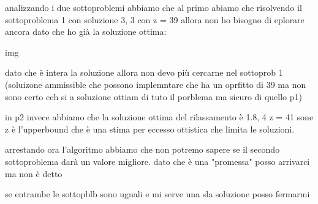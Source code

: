 analizzando i due sottoproblemi abbiamo che al primo abiamo che risolvendo il sottoproblema 1 con soluzione 3, 3 con z = 39 allora non ho bisogno di eplorare ancora dato che ho già la soluzione ottima:

img

dato che è intera la soluzione allora non devo più cercarne nel sottoprob 1 (soluizone ammissible che possono implemntare che ha un oprfitto di 39 ma non sono certo ceh si a soluzione ottiam di tuto il porblema ma sicuro di quello p1)


in p2 invece abbiamo che la soluzione ottima del rilassamento è 1.8, 4 z = 41 sone z è l'upperbound che è una stima per eccesso ottistica che limita le soluzioni.

arrestando ora l'algoritmo abbiamo che non potremo sapere se il secondo sottoproblema darà un valore migliore. dato che è una "promessa" posso arrivarci ma non è detto

se entrambe le sottopblb sono uguali e mi serve una sla soluzione posso fermarmi